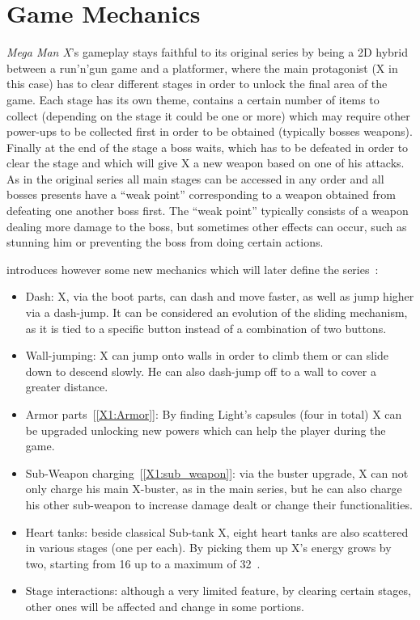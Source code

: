 \section{Game Mechanics}
\textit{Mega Man X}'s gameplay stays faithful to its original series by being a 2D hybrid between a run'n'gun game and a platformer, where the main protagonist (X in this case) has to clear different stages in order to unlock the final area of the game. Each stage has its own theme, contains a certain number of items to collect (depending on the stage it could be one or more) which may require other power-ups to be collected first in order to be obtained (typically bosses weapons). Finally at the end of the stage a boss waits, which has to be defeated in order to clear the stage and which will give X a new weapon based on one of his attacks. As in the original series all main stages can be accessed in any order and all bosses presents have a ``weak point'' corresponding to a weapon obtained from defeating one another boss first. The ``weak point'' typically consists of a weapon dealing more damage to the boss, but sometimes other effects can occur, such as stunning him or preventing the boss from doing certain actions.

\x introduces however some new mechanics which will later define the series~\cite{wiki:X1_features}:
\begin{itemize}
	\item Dash: X, via the boot parts, can dash and move faster, as well as jump higher via a dash-jump. It can be considered an evolution of the sliding mechanism, as it is tied to a specific button instead of a combination of two buttons.
	\item Wall-jumping: X can jump onto walls in order to climb them or can slide down to descend slowly. He can also dash-jump off to a wall to cover a greater distance.
	\item Armor parts~[\ref{X1:Armor}]: By finding Light's capsules (four in total) X can be upgraded unlocking new powers which can help the player during the game.
	\item Sub-Weapon charging~[\ref{X1:sub_weapon}]: via the buster upgrade, X can not only charge his main X-buster, as in the main series, but he can also charge his other sub-weapon to increase damage dealt or change their functionalities.
	\item Heart tanks: beside classical Sub-tank X, eight heart tanks are also scattered in various stages (one per each). By picking them up X's energy grows by two, starting from 16 up to a maximum of 32~\cite{stratwiki:Heart_tank}.
	\item Stage interactions: although a very limited feature, by clearing certain stages, other ones will be affected and change in some portions.
\end{itemize}

